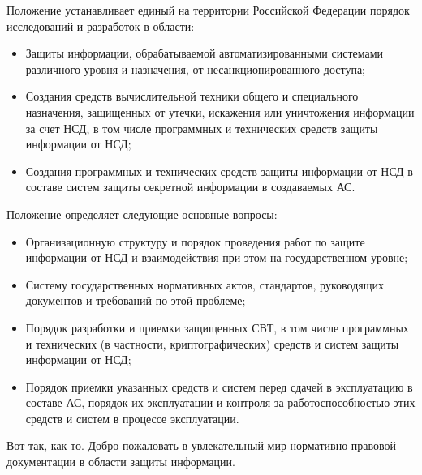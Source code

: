 Положение устанавливает единый на территории Российской Федерации порядок исследований и разработок в области:
\begin{itemize}
	\item Защиты информации, обрабатываемой автоматизированными системами различного уровня и назначения, от несанкционированного доступа;
	\item Создания средств вычислительной техники общего и специального назначения, защищенных от утечки, искажения или уничтожения информации за счет НСД, в том числе программных и технических средств защиты информации от НСД;
	\item Создания программных и технических средств защиты информации от НСД в составе систем защиты секретной информации в создаваемых АС.
\end{itemize}
Положение определяет следующие основные вопросы:
\begin{itemize}
	\item Организационную структуру и порядок проведения работ по защите информации от НСД и взаимодействия при этом на государственном уровне;
	\item Систему государственных нормативных актов, стандартов, руководящих документов и требований по этой проблеме;
	\item Порядок разработки и приемки защищенных СВТ, в том числе программных и технических (в частности, криптографических) средств и систем защиты информации от НСД;
	\item Порядок приемки указанных средств и систем перед сдачей в эксплуатацию в составе АС, порядок их эксплуатации и контроля за работоспособностью этих средств и систем в процессе эксплуатации.
\end{itemize}

Вот так, как-то. Добро пожаловать в увлекательный мир нормативно-правовой документации в области защиты информации.
